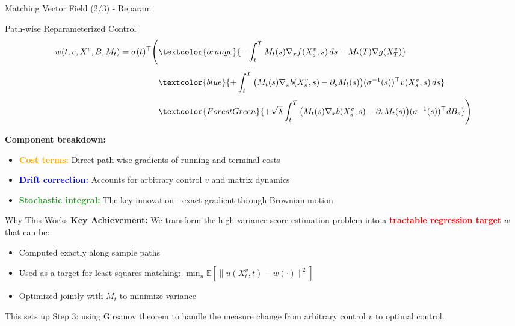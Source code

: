 \documentclass[aspectratio=169,xcolor=dvipsnames]{beamer}
\begin{document}
\begin{frame}[allowframebreaks]{Matching Vector Field (2/3) - Reparam}
    \begin{alertblock}{Path-wise Reparameterized Control}
        \begin{equation}
        \begin{aligned}
        w(t, v, X^v, B, M_t) 
        = \sigma(t)^\top \Bigg(
        &\textcolor{orange}{- \int_t^T M_t(s) \nabla_x f(X_s^v, s)\, ds - M_t(T)\nabla g(X_T^v)} \\[4pt]
        &\textcolor{blue}{+ \int_t^T \big(M_t(s)\nabla_x b(X_s^v, s) - \partial_s M_t(s)\big)(\sigma^{-1}(s))^\top v(X_s^v, s)\, ds} \\[4pt]
        &\textcolor{ForestGreen}{+ \sqrt{\lambda} \int_t^T \big(M_t(s)\nabla_x b(X_s^v, s) - \partial_s M_t(s)\big)(\sigma^{-1}(s))^\top dB_s}
        \Bigg)
        \end{aligned}
        \end{equation}
    \end{alertblock}
    
    \vspace{0.5cm}
    
    \textbf{Component breakdown:}
    \begin{itemize}
        \item \textcolor{orange}{\textbf{Cost terms:}} Direct path-wise gradients of running and terminal costs
        \item \textcolor{blue}{\textbf{Drift correction:}} Accounts for arbitrary control $v$ and matrix dynamics
        \item \textcolor{ForestGreen}{\textbf{Stochastic integral:}} The key innovation - exact gradient through Brownian motion
    \end{itemize}
    
    \vspace{0.8cm}
    
    \begin{block}{Why This Works}
        \textbf{Key Achievement:} We transform the high-variance score estimation problem into a \textcolor{red}{\textbf{tractable regression target}} $w$ that can be:
        \begin{itemize}
            \item Computed exactly along sample paths
            \item Used as a target for least-squares matching: $\min_u \mathbb{E}[\|u(X^v_t,t) - w(\cdot)\|^2]$
            \item Optimized jointly with $M_t$ to minimize variance
        \end{itemize}
        
        This sets up Step 3: using Girsanov theorem to handle the measure change from arbitrary control $v$ to optimal control.
    \end{block}
        
    \framebreak
\end{frame}
\end{document}
